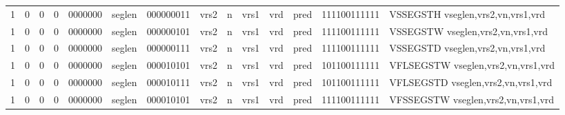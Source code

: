 \begin{landscape}
\begin{table}[p]
\begin{small}
\begin{center}
\begin{tabular}{p{0.08in}@{}p{0.08in}@{}p{0.08in}@{}p{0.08in}@{}p{0.50in}@{}p{0.30in}@{}p{0.08in}@{}p{0.8in}@{}p{0.48in}@{}p{0.32in}@{}p{0.08in}@{}p{0.8in}@{}p{0.8in}@{}p{0.4in}@{}p{0.56in}l}
\multicolumn{1}{|c|}{1} &
\multicolumn{1}{c|}{0} &
\multicolumn{1}{c|}{0} &
\multicolumn{1}{c|}{0} &
\multicolumn{1}{c|}{0000000} &
\multicolumn{1}{c|}{seglen} &
\multicolumn{2}{c|}{000000011} &
\multicolumn{2}{c|}{vrs2} &
\multicolumn{1}{c|}{n} &
\multicolumn{1}{c|}{vrs1} &
\multicolumn{1}{c|}{vrd} &
\multicolumn{1}{c|}{pred} &
\multicolumn{1}{c|}{111100111111} & VSSEGSTH vseglen,vrs2,vn,vrs1,vrd \\
\cline{1-15}
  

\multicolumn{1}{|c|}{1} &
\multicolumn{1}{c|}{0} &
\multicolumn{1}{c|}{0} &
\multicolumn{1}{c|}{0} &
\multicolumn{1}{c|}{0000000} &
\multicolumn{1}{c|}{seglen} &
\multicolumn{2}{c|}{000000101} &
\multicolumn{2}{c|}{vrs2} &
\multicolumn{1}{c|}{n} &
\multicolumn{1}{c|}{vrs1} &
\multicolumn{1}{c|}{vrd} &
\multicolumn{1}{c|}{pred} &
\multicolumn{1}{c|}{111100111111} & VSSEGSTW vseglen,vrs2,vn,vrs1,vrd \\
\cline{1-15}
  

\multicolumn{1}{|c|}{1} &
\multicolumn{1}{c|}{0} &
\multicolumn{1}{c|}{0} &
\multicolumn{1}{c|}{0} &
\multicolumn{1}{c|}{0000000} &
\multicolumn{1}{c|}{seglen} &
\multicolumn{2}{c|}{000000111} &
\multicolumn{2}{c|}{vrs2} &
\multicolumn{1}{c|}{n} &
\multicolumn{1}{c|}{vrs1} &
\multicolumn{1}{c|}{vrd} &
\multicolumn{1}{c|}{pred} &
\multicolumn{1}{c|}{111100111111} & VSSEGSTD vseglen,vrs2,vn,vrs1,vrd \\
\cline{1-15}
  

\multicolumn{1}{|c|}{1} &
\multicolumn{1}{c|}{0} &
\multicolumn{1}{c|}{0} &
\multicolumn{1}{c|}{0} &
\multicolumn{1}{c|}{0000000} &
\multicolumn{1}{c|}{seglen} &
\multicolumn{2}{c|}{000010101} &
\multicolumn{2}{c|}{vrs2} &
\multicolumn{1}{c|}{n} &
\multicolumn{1}{c|}{vrs1} &
\multicolumn{1}{c|}{vrd} &
\multicolumn{1}{c|}{pred} &
\multicolumn{1}{c|}{101100111111} & VFLSEGSTW vseglen,vrs2,vn,vrs1,vrd \\
\cline{1-15}
  

\multicolumn{1}{|c|}{1} &
\multicolumn{1}{c|}{0} &
\multicolumn{1}{c|}{0} &
\multicolumn{1}{c|}{0} &
\multicolumn{1}{c|}{0000000} &
\multicolumn{1}{c|}{seglen} &
\multicolumn{2}{c|}{000010111} &
\multicolumn{2}{c|}{vrs2} &
\multicolumn{1}{c|}{n} &
\multicolumn{1}{c|}{vrs1} &
\multicolumn{1}{c|}{vrd} &
\multicolumn{1}{c|}{pred} &
\multicolumn{1}{c|}{101100111111} & VFLSEGSTD vseglen,vrs2,vn,vrs1,vrd \\
\cline{1-15}
  

\multicolumn{1}{|c|}{1} &
\multicolumn{1}{c|}{0} &
\multicolumn{1}{c|}{0} &
\multicolumn{1}{c|}{0} &
\multicolumn{1}{c|}{0000000} &
\multicolumn{1}{c|}{seglen} &
\multicolumn{2}{c|}{000010101} &
\multicolumn{2}{c|}{vrs2} &
\multicolumn{1}{c|}{n} &
\multicolumn{1}{c|}{vrs1} &
\multicolumn{1}{c|}{vrd} &
\multicolumn{1}{c|}{pred} &
\multicolumn{1}{c|}{111100111111} & VFSSEGSTW vseglen,vrs2,vn,vrs1,vrd \\
\cline{1-15}
  


\end{tabular}
\end{center}
\end{small}
\end{table}
\end{landscape}
